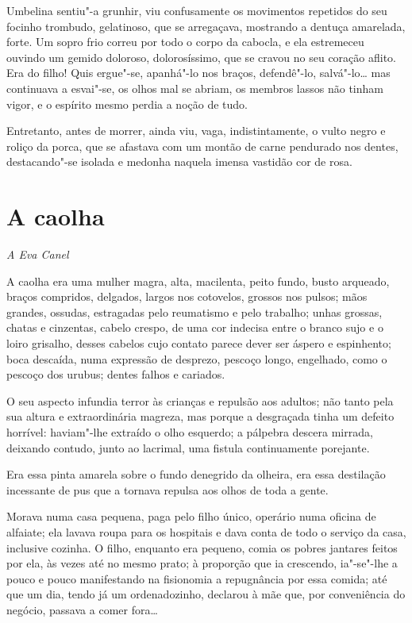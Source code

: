 Umbelina sentiu"-a grunhir, viu confusamente os movimentos repetidos do
seu focinho trombudo, gelatinoso, que se arregaçava, mostrando a dentuça
amarelada, forte. Um sopro frio correu por todo o corpo da cabocla, e
ela estremeceu ouvindo um gemido doloroso, dolorosíssimo, que se cravou
no seu coração aflito. Era do filho! Quis ergue"-se, apanhá"-lo nos
braços, defendê"-lo, salvá"-lo\ldots{} mas continuava a esvai"-se, os olhos mal
se abriam, os membros lassos não tinham vigor, e o espírito mesmo perdia
a noção de tudo.

Entretanto, antes de morrer, ainda viu, vaga, indistintamente, o vulto
negro e roliço da porca, que se afastava com um montão de carne
pendurado nos dentes, destacando"-se isolada e medonha naquela imensa
vastidão cor de rosa.

\chapter{A caolha}

\hfill{}\emph{A Eva Canel}

\bigskip

A caolha era uma mulher magra, alta, macilenta, peito fundo, busto
arqueado, braços compridos, delgados, largos nos cotovelos, grossos nos
pulsos; mãos grandes, ossudas, estragadas pelo reumatismo e pelo
trabalho; unhas grossas, chatas e cinzentas, cabelo crespo, de uma cor
indecisa entre o branco sujo e o loiro grisalho, desses cabelos cujo
contato parece dever ser áspero e espinhento; boca descaída, numa
expressão de desprezo, pescoço longo, engelhado, como o pescoço dos
urubus; dentes falhos e cariados.

O seu aspecto infundia terror às crianças e repulsão aos adultos; não
tanto pela sua altura e extraordinária magreza, mas porque a desgraçada
tinha um defeito horrível: haviam"-lhe extraído o olho esquerdo; a
pálpebra descera mirrada, deixando contudo, junto ao lacrimal, uma
fistula continuamente porejante.

Era essa pinta amarela sobre o fundo denegrido da olheira, era essa
destilação incessante de pus que a tornava repulsa aos olhos de toda a
gente.

Morava numa casa pequena, paga pelo filho único, operário numa oficina
de alfaiate; ela lavava roupa para os hospitais e dava conta de todo o
serviço da casa, inclusive cozinha. O filho, enquanto era pequeno, comia
os pobres jantares feitos por ela, às vezes até no mesmo prato; à
proporção que ia crescendo, ia"-se"-lhe a pouco e pouco manifestando na
fisionomia a repugnância por essa comida; até que um dia, tendo já um
ordenadozinho, declarou à mãe que, por conveniência do negócio, passava
a comer fora\ldots{}

